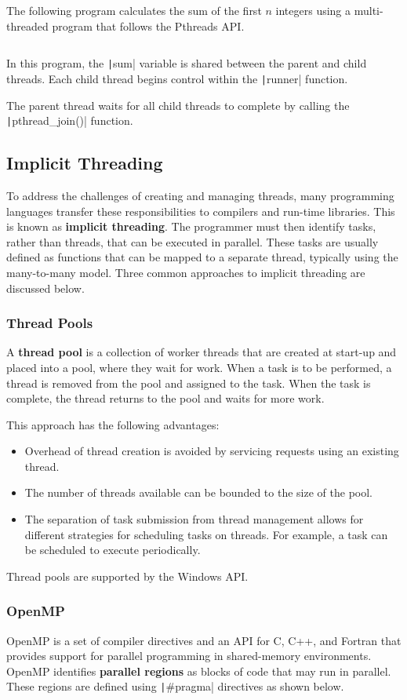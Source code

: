 \documentclass{article}
\begin{document}
The following program calculates the sum of the first \(n\) integers
using a multi-threaded program that follows the Pthreads API.
\inputminted{c}{code/pthreads_multithreading.c} In this program, the
\texttt|sum| variable is shared between the parent and child
threads. Each child thread begins control within the
\texttt|runner| function.

The parent thread waits for all child threads to complete by calling
the \texttt|pthread_join()| function.
\subsection{Implicit Threading}
To address the challenges of creating and managing threads, many
programming languages transfer these responsibilities to compilers and
run-time libraries. This is known as \textbf{implicit threading}. The
programmer must then identify tasks, rather than threads, that can be
executed in parallel. These tasks are usually defined as functions that
can be mapped to a separate thread, typically using the many-to-many
model. Three common approaches to implicit threading are discussed
below.
\subsubsection{Thread Pools}
A \textbf{thread pool} is a collection of worker threads that are
created at start-up and placed into a pool, where they wait for work.
When a task is to be performed, a thread is removed from the pool and
assigned to the task. When the task is complete, the thread returns to
the pool and waits for more work.

This approach has the following advantages:
\begin{itemize}
    \item Overhead of thread creation is avoided by servicing requests
          using an existing thread.
    \item The number of threads available can be bounded to the size of
          the pool.
    \item The separation of task submission from thread management
          allows for different strategies for scheduling tasks on
          threads. For example, a task can be scheduled to execute
          periodically.
\end{itemize}
Thread pools are supported by the Windows API.
\subsubsection{OpenMP}
OpenMP is a set of compiler directives and an API for C, C++, and
Fortran that provides support for parallel programming in shared-memory
environments. OpenMP identifies \textbf{parallel regions} as blocks of
code that may run in parallel. These regions are defined using
\texttt|#pragma| directives as shown below.
\end{document}
